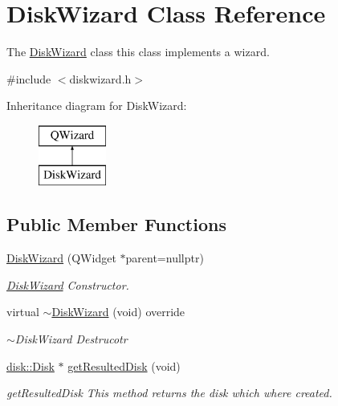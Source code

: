 \hypertarget{class_disk_wizard}{}\section{Disk\+Wizard Class Reference}
\label{class_disk_wizard}


The \mbox{\hyperlink{class_disk_wizard}{Disk\+Wizard}} class this class implements a wizard.  




{\ttfamily \#include $<$diskwizard.\+h$>$}

Inheritance diagram for Disk\+Wizard\+:\begin{figure}[H]
\begin{center}
\leavevmode
\includegraphics[height=2.000000cm]{class_disk_wizard}
\end{center}
\end{figure}
\subsection*{Public Member Functions}
\begin{DoxyCompactItemize}
\item 
\mbox{\hyperlink{class_disk_wizard_a728f3938ee8a8f44cef12158b6e6ab1f}{Disk\+Wizard}} (Q\+Widget $\ast$parent=nullptr)
\begin{DoxyCompactList}\small\item\em \mbox{\hyperlink{class_disk_wizard}{Disk\+Wizard}} Constructor. \end{DoxyCompactList}\item 
\mbox{\label{class_disk_wizard_a9376442c638a808b79a27be0379f83c2}} 
virtual \mbox{\hyperlink{class_disk_wizard_a9376442c638a808b79a27be0379f83c2}{$\sim$\+Disk\+Wizard}} (void) override
\begin{DoxyCompactList}\small\item\em $\sim$\+Disk\+Wizard Destrucotr \end{DoxyCompactList}\item 
\mbox{\hyperlink{classdisk_1_1_disk}{disk\+::\+Disk}} $\ast$ \mbox{\hyperlink{class_disk_wizard_a301923c0d1511e93504a61f465796ca7}{get\+Resulted\+Disk}} (void)
\begin{DoxyCompactList}\small\item\em get\+Resulted\+Disk This method returns the disk which where created. \end{DoxyCompactList}\end{DoxyCompactItemize}
